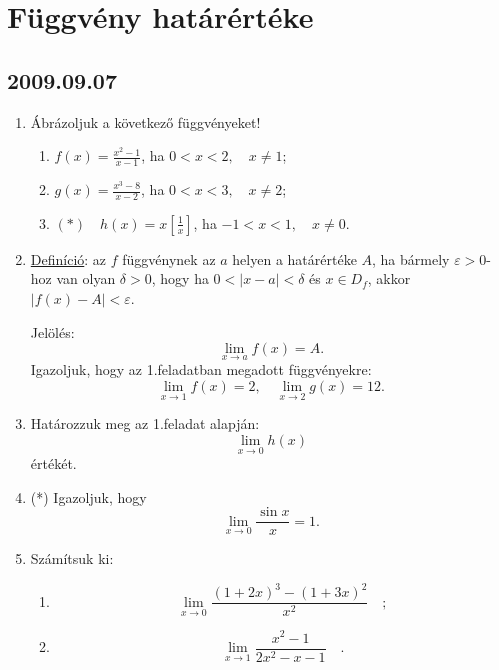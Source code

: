 \documentclass{article}
\newenvironment{abc}{\begin{enumerate}[label=\textit{\alph*})]}{\end{enumerate}}
\begin{document}
\section{Függvény határértéke}
\subsection*{2009.09.07}
\begin{enumerate}
\item Ábrázoljuk a következő függvényeket!
\begin{abc}
\item $f(x)=\frac{x^2-1}{x-1}$, ha $0<x<2,\quad x\not=1$;
\item $g(x)=\frac{x^3-8}{x-2}$, ha
$0<x<3,\quad x\not=2$;
\item$(*)\quad h(x)=x[\frac{1}{x}]$, ha $-1<x<1,\quad x\not=0$.
\end{abc}
\item\underline{Definíció}: az $f$ függvénynek az $a$ helyen a határértéke $A$, ha bármely $\varepsilon>0$-hoz van olyan $\delta>0$, hogy ha $0<|x-a|<\delta$ és $x\in D_f$, akkor $|f(x)-A|<\varepsilon$.

Jelölés: $$\lim_{x\to a}f(x)=A.$$
Igazoljuk, hogy az 1.feladatban megadott függvényekre: 
$$\lim_{x\to 1}f(x)=2,\quad \lim_{x\to 2}g(x)=12.$$
\item Határozzuk meg az 1.feladat alapján:
$$\lim_{x\to 0}h(x)$$értékét.
\item(*) Igazoljuk, hogy
$$\lim_{x\to 0}\frac{\sin x}{x}=1.$$
\item Számítsuk ki:
\begin{abc}
\item $$\lim_{x\to 0}\frac{(1+2x)^3-(1+3x)^2}{x^2}\quad;$$
\item $$\lim_{x\to 1}\frac{x^2-1}{2x^2-x-1}\quad.$$
\end{abc}
\end{enumerate}
\end{document}
